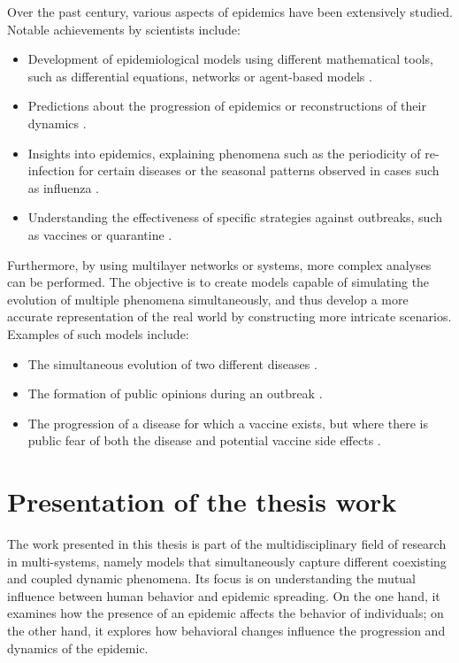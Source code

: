 Over the past century, various aspects of epidemics have been extensively studied. Notable achievements by scientists include:
\begin{itemize}
	\item Development of epidemiological models using different mathematical tools, such as differential equations, networks or agent-based models \cite{Hernandez_Vargas_2022, Keeling_2005}.
	\item Predictions about the progression of epidemics or reconstructions of their dynamics \cite{diekmann2000mathematical, brauer2012mathematical, Ledder_2023}.
	\item Insights into epidemics, explaining phenomena such as the periodicity of re-infection for certain diseases or the seasonal patterns observed in cases such as influenza \cite{Bjoernstad2016}.
	\item Understanding the effectiveness of specific strategies against outbreaks, such as vaccines or quarantine \cite{Wang_2015_review}.
\end{itemize}
Furthermore, by using multilayer networks or systems, more complex analyses can be performed. The objective is to create models capable of simulating the evolution of multiple phenomena simultaneously, and thus develop a more accurate representation of the real world by constructing more intricate scenarios. Examples of such models include:
\begin{itemize}
	\item The simultaneous evolution of two different diseases \cite{DeDomenico2016}.
	\item The formation of public opinions during an outbreak \cite{teslya2022}.
	\item The progression of a disease for which a vaccine exists, but where there is public fear of both the disease and potential vaccine side effects \cite{Epstein_2021}.
\end{itemize}

\section{Presentation of the thesis work}
The work presented in this thesis is part of the multidisciplinary field of research in multi-systems, namely models that simultaneously capture different coexisting and coupled dynamic phenomena. Its focus is on understanding the mutual influence between human behavior and epidemic spreading. On the one hand, it examines how the presence of an epidemic affects the behavior of individuals; on the other hand, it explores how behavioral changes influence the progression and dynamics of the epidemic.

